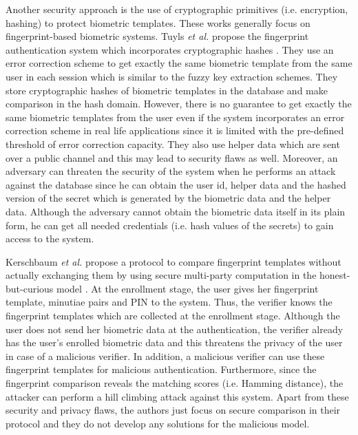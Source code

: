 \documentclass[journal]{IEEEtran}
\begin{document}
Another security approach is the use of cryptographic primitives (i.e. encryption, hashing) to protect biometric templates. These works generally focus on fingerprint-based biometric systems. Tuyls \textit{et al.} propose the fingerprint authentication system which incorporates cryptographic hashes \cite{Tuyls}. They use an error correction scheme to get exactly the same biometric template from the same user in each session which is similar to the fuzzy key extraction schemes. They store cryptographic hashes of biometric templates in the database and make comparison in the hash domain. However, there is no guarantee to get exactly the same biometric templates from the user even if the system incorporates an error correction scheme in real life applications since it is limited with the pre-defined threshold of error correction capacity. They also use helper data which are sent over a public channel and this may lead to security flaws as well. Moreover, an adversary can threaten the security of the system when he performs an attack against the database since he can obtain the user id, helper data and the hashed version of the secret which is generated by the biometric data and the helper data. Although the adversary cannot obtain the biometric data itself in its plain form, he can get all needed credentials (i.e. hash values of the secrets) to gain access to the system.

Kerschbaum \textit {et al.} propose a protocol to compare fingerprint templates without actually exchanging them by using secure multi-party computation in the honest-but-curious model \cite{Kerschbaum}. At the enrollment stage, the user gives her fingerprint template, minutiae pairs and PIN to the system. Thus, the verifier knows the fingerprint templates which are collected at the enrollment stage.  Although the user does not send her biometric data at the authentication, the verifier already has the user's enrolled biometric data and this threatens the privacy of the user in case of a malicious verifier. In addition, a malicious verifier can use these fingerprint templates for malicious authentication. Furthermore, since the fingerprint comparison reveals the  matching scores (i.e. Hamming distance\cite{Hamming}), the attacker can perform a hill climbing attack against this system. Apart from these security and privacy flaws, the authors just focus on secure comparison in their protocol and they do not develop any solutions for the malicious model. 
\end{document}
